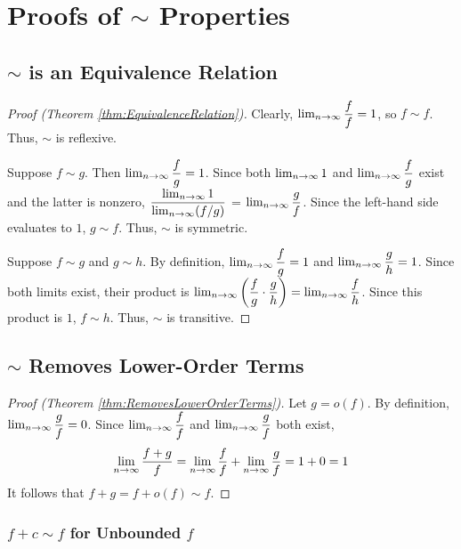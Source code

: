 \appendix
\appendixpage

\section{Proofs of $\sim$ Properties}

\subsection{$\sim$ is an Equivalence Relation}

\begin{proof}[Proof (Theorem \ref{thm:EquivalenceRelation})]
	Clearly, $\lim_{n \to \infty} \dfrac{f}{f} = 1$, so $f \sim f$. Thus, $\sim$ is reflexive.
	
	Suppose $f \sim g$. Then $\lim_{n \to \infty} \dfrac{f}{g} = 1$. Since both $\lim_{n \to \infty} 1$ and $\lim_{n \to \infty} \dfrac{f}{g}$ exist and the latter is nonzero, $\dfrac{\lim_{n \to \infty} 1}{\lim_{n \to \infty} (f / g)}$ = $\lim_{n \to \infty} \dfrac{g}{f}$. Since the left-hand side evaluates to $1$, $g \sim f$. Thus, $\sim$ is symmetric.
	
	Suppose $f \sim g$ and $g \sim h$. By definition, $\lim_{n \to \infty} \dfrac{f}{g} = 1$ and $\lim_{n \to \infty} \dfrac{g}{h} = 1$. Since both limits exist, their product is $\lim_{n \to \infty} \left( \dfrac{f}{g} \cdot \dfrac{g}{h} \right) = \lim_{n \to \infty} \dfrac{f}{h}$. Since this product is $1$, $f \sim h$. Thus, $\sim$ is transitive.
\end{proof}

\subsection{$\sim$ Removes Lower-Order Terms}

\begin{proof}[Proof (Theorem \ref{thm:RemovesLowerOrderTerms})]
	Let $g = o(f)$. By definition, $\lim_{n \to \infty} \dfrac{g}{f} = 0$. Since $\lim_{n \to \infty} \dfrac{f}{f}$ and $\lim_{n \to \infty} \dfrac{g}{f}$ both exist,
	\begin{align*}
	\lim_{n \to \infty} \dfrac{f + g}{f} = \lim_{n \to \infty} \dfrac{f}{f} + \lim_{n \to \infty} \dfrac{g}{f} = 1 + 0 = 1
	\end{align*}
	It follows that $f + g = f + o(f) \sim f$.
\end{proof}

\subsubsection{$f + c \sim f$ for Unbounded $f$}

